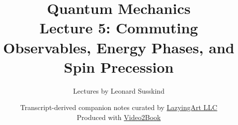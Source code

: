 \documentclass[11pt,oneside]{book}
\begin{document}
\frontmatter
\hypersetup{pageanchor=false}
\title{Quantum Mechanics\\[0.45em]
\large Lecture 5: Commuting Observables, Energy Phases, and Spin Precession}
\author{Lectures by Leonard Susskind}
\date{Transcript-derived companion notes curated by
\href{https://lazying.art}{LazyingArt LLC}\\[0.35em]
\small Produced with
\href{https://github.com/lachlanchen/Video2Book}{Video2Book}}
\maketitle
\clearpage
\hypersetup{pageanchor=true}
\mainmatter

\end{document}
